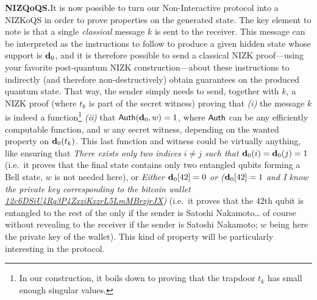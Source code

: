 \noindent\textbf{NIZQoQS.}\quad It is now possible to turn our Non-Interactive \RSP{} protocol into a NIZKoQS in order to prove properties on the generated state. The key element to note is that a single \emph{classical} message $k$ is sent to the receiver. This message can be interpreted as the instructions to follow to produce a given hidden \GHZ{} state whose support is $\mathbf{d}_0$, and it is therefore possible to send a classical NIZK proof---using your favorite post-quantum NIZK construction---about these instructions to indirectly (and therefore non-destructively) obtain guarantees on the produced quantum state. That way, the sender simply needs to send, together with $k$, a NIZK proof (where $t_k$ is part of the secret witness) proving that \emph{(i)} the message $k$ is indeed a \AssumpFct{} function\footnote{In our construction, it boils down to proving that the trapdoor $t_k$ has small enough singular values.} \emph{(ii)} that ${\sf Auth}(\mathbf{d}_0,w) = 1$, where ${\sf Auth}$ can be any efficiently computable function, and $w$ any secret witness, depending on the wanted property on $\mathbf{d}_0(t_k)$. This last function and witness could be virtually anything, like ensuring that \emph{There exists only two indices $i \neq j$ such that $\mathbf{d}_0(i)=\mathbf{d}_0(j) = 1$} (i.e.\ it proves that the final state contains only two entangled qubits forming a Bell state, $w$ is not needed here), or \emph{Either $\mathbf{d}_0[42]=0$ or ($\mathbf{d}_0[42]=1$ and I know the private key corresponding to the bitcoin wallet \href{https://www.blockchain.com/btc/address/12c6DSiU4Rq3P4ZxziKxzrL5LmMBrzjrJX}{12c6DSiU4Rq3P4ZxziKxzrL5LmMBrzjrJX})} (i.e.\ it proves that the 42th qubit is entangled to the rest of the \GHZ{} only if the sender is Satoshi Nakamoto\dots{} of course without revealing to the receiver if the sender is Satoshi Nakamoto; $w$ being here the private key of the wallet). This kind of property will be particularly interesting in the \authBlindCanDist{} protocol.\\

